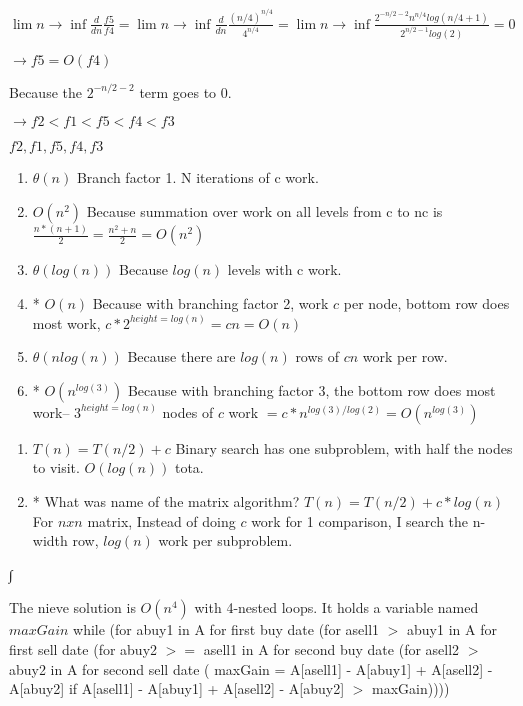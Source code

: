 \documentclass[12pt,twoside]{article}
\begin{document}
\begin{problems}
\begin{problemparts}
$ \lim n \rightarrow \inf \frac{d}{dn} \frac{f5}{f4} = \lim n \rightarrow \inf \frac{d}{dn} \frac{(n/4)^{n/4}}{4^{n/4}} = \lim n \rightarrow \inf \frac{2^{-n/2 -2}n^{n/4}log(n/4 +1)}{2^{n/2 -1}log(2)} = 0 $

$ \rightarrow f5 = O(f4) $

Because the $2^{-n/2 -2}$ term goes to $0$.

$ \rightarrow f2 < f1 < f5 < f4 < f3 $

$ f2, f1, f5, f4, f3 $

\end{problemparts}

\problem  %

\begin{problemparts}
\problempart
\begin{enumerate}
\item $\theta(n)$ Branch factor 1. N iterations of c work.
\item $O(n^2)$ Because summation over work on all levels from c to nc is $\frac{n*(n+1)}{2} = \frac{n^2 + n}{2} = O(n^2)$
\item $\theta(log(n))$ Because $log(n)$ levels with c work.
\item * $O(n)$ Because with branching factor 2, work $c$ per node, bottom row does most work, $c*2^{height = log(n)} = cn = O(n)$
\item $\theta(nlog(n))$ Because there are $log(n)$ rows of $cn$ work per row.
\item * $O(n^{log(3)})$ Because with branching factor 3, the bottom row does most work– $3^{height = log(n)}$ nodes of $c$ work $= c*n^{log(3)/log(2)} = O(n^{log(3)})$
\end{enumerate}
\problempart
\begin{enumerate}
\item $T(n) = T(n/2) + c$ Binary search has one subproblem, with half the nodes to visit. $O(log(n))$ tota.
\item * What was name of the matrix algorithm? $T(n) = T(n/2) + c*log(n)$ For $nxn$ matrix, Instead of doing $c$ work for 1 comparison, I search the n-width row, $log(n)$ work per subproblem.
\end{enumerate}∫
\end{problemparts}

\problem  %
\begin{problemparts}
\problempart The nieve solution is $O(n^4)$ with 4-nested loops. It holds a variable named $maxGain$ while (for abuy1 in A for first buy date (for asell1 $>$ abuy1 in A for first sell date (for abuy2 $>=$ asell1 in A for second buy date (for asell2 $>$ abuy2 in A for second sell date ( maxGain = A[asell1] - A[abuy1] + A[asell2] - A[abuy2] if A[asell1] - A[abuy1] + A[asell2] - A[abuy2] $>$ maxGain))))



\end{problemparts}
\end{problems}
\end{document}
